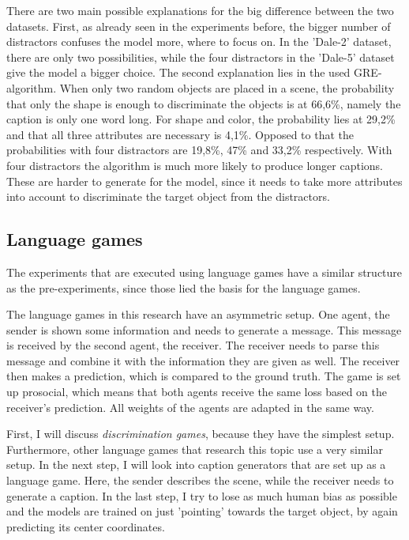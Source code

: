 There are two main possible explanations for the big difference between the two datasets.
First, as already seen in the experiments before, the bigger number of distractors confuses the model more, where to focus on.
In the 'Dale-2' dataset, there are only two possibilities, while the four distractors in the 'Dale-5' dataset give the model a bigger choice.
The second explanation lies in the used GRE-algorithm.
When only two random objects are placed in a scene, the probability that only the shape is enough to discriminate the objects is at 66,6\%, namely the caption is only one word long.
For shape and color, the probability lies at 29,2\% and that all three attributes are necessary is 4,1\%.
Opposed to that the probabilities with four distractors are 19,8\%, 47\% and 33,2\% respectively.
With four distractors the algorithm is much more likely to produce longer captions.
These are harder to generate for the model, since it needs to take more attributes into account to discriminate the target object from the distractors.

\subsection{Language games}
\label{sec:language-games}

The experiments that are executed using language games have a similar structure as the pre-experiments, since those lied the basis for the language games.

The language games in this research have an asymmetric setup.
One agent, the sender is shown some information and needs to generate a message.
This message is received by the second agent, the receiver.
The receiver needs to parse this message and combine it with the information they are given as well.
The receiver then makes a prediction, which is compared to the ground truth.
The game is set up prosocial, which means that both agents receive the same loss based on the receiver's prediction.
All weights of the agents are adapted in the same way.


First, I will discuss \emph{discrimination games}, because they have the simplest setup.
Furthermore, other language games that research this topic use a very similar setup.
In the next step, I will look into caption generators that are set up as a language game.
Here, the sender describes the scene, while the receiver needs to generate a caption.
In the last step, I try to lose as much human bias as possible and the models are trained on just 'pointing' towards the target object, by again predicting its center coordinates.

